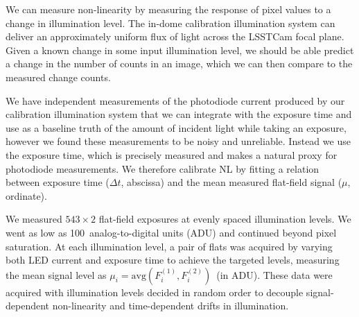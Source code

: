 We can measure non-linearity by measuring the response of pixel values to a change in illumination level.
The in-dome calibration illumination system can deliver an approximately uniform flux of light across the LSSTCam focal plane.
Given a known change in some input illumination level, we should be able predict a change in the number of counts in an image, which we can then compare to the measured change counts.

We have independent measurements of the photodiode current produced by our calibration illumination system that we can integrate with the exposure time and use as a baseline truth of the amount of incident light while taking an exposure,
however we found these measurements to be noisy and unreliable. Instead we use the exposure time, which is precisely measured and makes a natural proxy for photodiode measurements.
We therefore calibrate NL by fitting a relation between exposure time ($\Delta t$, abscissa) and the mean measured flat-field signal ($\mu$, ordinate).

We measured $543\times2$ flat-field exposures at evenly spaced illumination levels.  We went as low as 100~analog-to-digital units (ADU) and continued beyond pixel saturation.
At each illumination level, a pair of flats was acquired by varying both LED current and exposure time to achieve the targeted levels, measuring the mean signal level as $\mu_i = \mathrm{avg}(F_i^{(1)},F_i^{(2)})$~(in ADU).
These data were acquired with illumination levels decided in random order to decouple signal-dependent non-linearity and time-dependent drifts in illumination.


